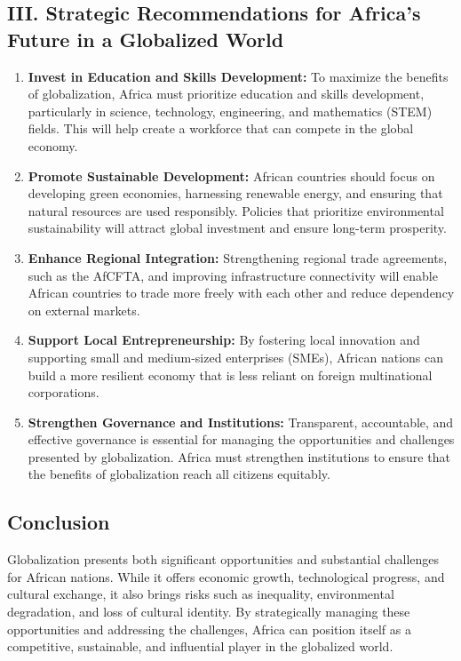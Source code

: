 \documentclass[10pt]{article}
\begin{document}
\subsection*{III. Strategic Recommendations for Africa's Future in a Globalized World}
\begin{enumerate}
  \item \textbf{Invest in Education and Skills Development:} To maximize the benefits of globalization,
    Africa must prioritize education and skills development, particularly in science,
    technology, engineering, and mathematics (STEM) fields. This will help create a
    workforce that can compete in the global economy.

  \item \textbf{Promote Sustainable Development:} African countries should focus on developing green
    economies, harnessing renewable energy, and ensuring that natural resources are used
    responsibly. Policies that prioritize environmental sustainability will attract global
    investment and ensure long-term prosperity.

  \item \textbf{Enhance Regional Integration:} Strengthening regional trade agreements, such as the
    AfCFTA, and improving infrastructure connectivity will enable African countries to trade
    more freely with each other and reduce dependency on external markets.

  \item \textbf{Support Local Entrepreneurship:} By fostering local innovation and supporting small and
    medium-sized enterprises (SMEs), African nations can build a more resilient economy
    that is less reliant on foreign multinational corporations.

  \item \textbf{Strengthen Governance and Institutions:} Transparent, accountable, and effective
    governance is essential for managing the opportunities and challenges presented by
    globalization. Africa must strengthen institutions to ensure that the benefits of
    globalization reach all citizens equitably.
\end{enumerate}

\subsection*{Conclusion}
Globalization presents both significant opportunities and substantial challenges for African
nations. While it offers economic growth, technological progress, and cultural exchange, it also
brings risks such as inequality, environmental degradation, and loss of cultural identity. By
strategically managing these opportunities and addressing the challenges, Africa can position
itself as a competitive, sustainable, and influential player in the globalized world.
\end{document}
